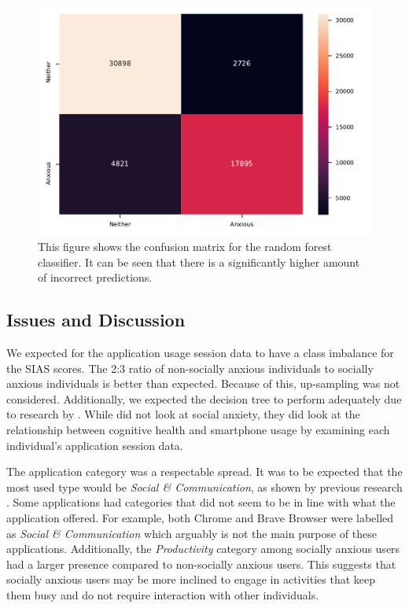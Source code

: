 \documentclass{l4proj}
\begin{document}
\begin{figure}[htb]
    \centering
    \includegraphics[width=0.80\linewidth]{images/sessions/heatmap_EnsembleRandomForestSessions.pdf}
    \caption{This figure shows the confusion matrix for the random forest classifier. It can be seen that there is a significantly higher amount of incorrect predictions.}
    \label{fig:session_random_forest_matrix} 
\end{figure}

\subsection{Issues and Discussion}
We expected for the application usage session data to have a class imbalance for the SIAS scores. The 2:3 ratio of non-socially anxious individuals to socially anxious individuals is better than expected. Because of this, up-sampling was not considered. Additionally, we expected the decision tree to perform adequately due to research by \citet{apple_patterns}. While \citet{apple_patterns} did not look at social anxiety, they did look at the relationship between cognitive health and smartphone usage by examining each individual's application session data.

The application category was a respectable spread. It was to be expected that the most used type would be \textit{Social \& Communication}, as shown by previous research \citet{different_users_thru_app_usage, angry_birds_study}. Some applications had categories that did not seem to be in line with what the application offered. For example, both Chrome and Brave Browser were labelled as \textit{Social \& Communication} which arguably is not the main purpose of these applications. Additionally, the \textit{Productivity} category among socially anxious users had a larger presence compared to non-socially anxious users. This suggests that socially anxious users may be more inclined to engage in activities that keep them busy and do not require interaction with other individuals.
\end{document}
